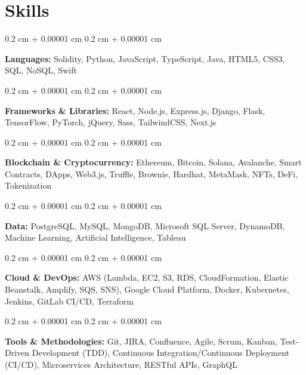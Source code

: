 \documentclass[10pt, letterpaper]{article}
\newenvironment{onecolentry}{
    \begin{adjustwidth}{
        0.2 cm + 0.00001 cm
    }{
        0.2 cm + 0.00001 cm
    }
}{
    \end{adjustwidth}
} %
\begin{document}
    
    \section{Skills}



        
        \begin{onecolentry}
            \textbf{Languages:} Solidity, Python, JavaScript, TypeScript, Java, HTML5, CSS3, SQL, NoSQL, Swift
        \end{onecolentry}

        \vspace{0.2 cm}

        \begin{onecolentry}
            \textbf{Frameworks \& Libraries:} React, Node.js, Express.js, Django, Flask, TensorFlow, PyTorch, jQuery, Sass, TailwindCSS, Next.js
        \end{onecolentry}

        \vspace{0.2 cm}

        \begin{onecolentry}
            \textbf{Blockchain \& Cryptocurrency:} Ethereum, Bitcoin, Solana, Avalanche, Smart Contracts, DApps, Web3.js, Truffle, Brownie, Hardhat, MetaMask, NFTs, DeFi, Tokenization
        \end{onecolentry}

        \vspace{0.2 cm}

        \begin{onecolentry}
            \textbf{Data:} PostgreSQL, MySQL, MongoDB, Microsoft SQL Server, DynamoDB, Machine Learning, Artificial Intelligence, Tableau
        \end{onecolentry}

        \vspace{0.2 cm}

        \begin{onecolentry}
            \textbf{Cloud \& DevOps:} AWS (Lambda, EC2, S3, RDS, CloudFormation, Elastic Beanstalk, Amplify, SQS, SNS), Google Cloud Platform, Docker, Kubernetes, Jenkins, GitLab CI/CD, Terraform
        \end{onecolentry}

        \vspace{0.2 cm}

        \begin{onecolentry}
            \textbf{Tools \& Methodologies:} Git, JIRA, Confluence, Agile, Scrum, Kanban, Test-Driven Development (TDD), Continuous Integration/Continuous Deployment (CI/CD), Microservices Architecture, RESTful APIs, GraphQL
        \end{onecolentry}
\end{document}
